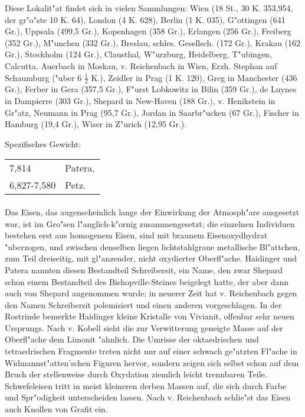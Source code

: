 \documentclass[a4paper, 11pt, oneside]{article}
\begin{document}
Diese Lokalit"at findet sich in vielen Sammlungen: Wien (18 St., 30 K. 353,954, der gr"o"ste 10 K. 64), London (4 K. 628), Berlin (1 K. 035), G"ottingen (641 Gr.), Uppsala (499,5 Gr.), Kopenhagen (358 Gr.), Erlangen (256 Gr.), Freiberg (352 Gr.), M"unchen (332 Gr.), Breslau, schles. Gesellsch. (172 Gr.), Krakau (162 Gr.), Stockholm (124 Gr.), Clausthal, W"urzburg, Heidelberg, T"ubingen, Calcutta. Auerbach in Moskau, v. Reichenbach in Wien, Erzh. Stephan auf Schaumburg ("uber 6 $\frac{1}{2}$ K.), Zeidler in Prag (1 K. 120), Greg in Manchester (436 Gr.), Ferber in Gera (357,5 Gr.), F"urst Lobkowitz in Bilin (359 Gr.), de Luynes in Dampierre (303 Gr.), Shepard in New-Haven (188 Gr.), v. Henikstein in Gr"atz, Neumann in Prag (95,7 Gr.), Jordan in Saarbr"ucken (67 Gr.), Fischer in Hamburg (19,4 Gr.), Wiser in Z"urich (12,95 Gr.).

Spezifisches Gewicht:  
\begin{table}[!ht]
    \centering
    \begin{tabular}{l l}
        7,814 & Patera,\\
        6,827-7,580 & Petz.
    \end{tabular}
\end{table}
\paragraph{}
Das Eisen, das augenscheinlich lange der Einwirkung der Atmosph"are ausgesetzt war, ist im Gro"sen l"anglich-k"ornig zusammengesetzt; die einzelnen Individuen bestehen erst aus homogenem Eisen, sind mit braunem Eisenoxydhydrat "uberzogen, und zwischen denselben liegen lichtstahlgraue metallische Bl"attchen, zum Teil dreiseitig, mit gl"anzender, nicht oxydierter Oberfl"ache. Haidinger und Patera nannten diesen Bestandteil Schreibersit, ein Name, den zwar Shepard schon einem Bestandteil des Bishopville-Steines beigelegt hatte, der aber dann auch von Shepard angenommen wurde; in neuerer Zeit hat v. Reichenbach gegen den Namen Schreibersit polemisiert und einen anderen vorgeschlagen. In der Rostrinde bemerkte Haidinger kleine Kristalle von Vivianit, offenbar sehr neuen Ursprungs. Nach v. Kobell sieht die zur Verwitterung geneigte Masse auf der Oberfl"ache dem Limonit "ahnlich. Die Umrisse der oktaedrischen und tetraedrischen Fragmente treten nicht nur auf einer schwach ge"atzten Fl"ache in Widmannst"atten'schen Figuren hervor, sondern zeigen sich selbst schon auf dem Bruch der stellenweise durch Oxydation ziemlich leicht trennbaren Teile. Schwefeleisen tritt in meist kleineren derben Massen auf, die sich durch Farbe und Spr"odigkeit unterscheiden lassen. Nach v. Reichenbach schlie"st das Eisen auch Knollen von Grafit ein.
\end{document}
